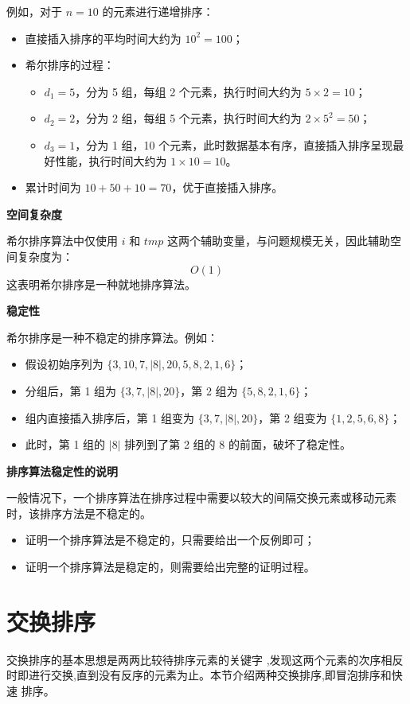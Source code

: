 \documentclass[lang=cn,newtx,10pt,scheme=chinese]{../elegantbook}
\begin{document}
例如，对于 $n = 10$ 的元素进行递增排序：
\begin{itemize}
  \item 直接插入排序的平均时间大约为 $10^2 = 100$；
  \item 希尔排序的过程：
    \begin{itemize}
      \item $d_1 = 5$，分为 5 组，每组 2 个元素，执行时间大约为 $5 \times 2 = 10$；
      \item $d_2 = 2$，分为 2 组，每组 5 个元素，执行时间大约为 $2 \times 5^2 = 50$；
      \item $d_3 = 1$，分为 1 组，10 个元素，此时数据基本有序，直接插入排序呈现最好性能，执行时间大约为 $1 \times 10 = 10$。
    \end{itemize}
  \item 累计时间为 $10 + 50 + 10 = 70$，优于直接插入排序。
\end{itemize}


\textbf{空间复杂度}  

希尔排序算法中仅使用 $i$ 和 $tmp$ 这两个辅助变量，与问题规模无关，因此辅助空间复杂度为：
\[
O(1)
\]
这表明希尔排序是一种就地排序算法。


\textbf{稳定性}  

希尔排序是一种不稳定的排序算法。例如：
\begin{itemize}
  \item 假设初始序列为 $\{3, 10, 7, |8|, 20, 5, 8, 2, 1, 6\}$；
  \item 分组后，第 1 组为 $\{3, 7, |8|, 20\}$，第 2 组为 $\{5, 8, 2, 1, 6\}$；
  \item 组内直接插入排序后，第 1 组变为 $\{3, 7, |8|, 20\}$，第 2 组变为 $\{1, 2, 5, 6, 8\}$；
  \item 此时，第 1 组的 $|8|$ 排列到了第 2 组的 $8$ 的前面，破坏了稳定性。
\end{itemize}


\textbf{排序算法稳定性的说明}

一般情况下，一个排序算法在排序过程中需要以较大的间隔交换元素或移动元素时，该排序方法是不稳定的。  
\begin{itemize}
  \item 证明一个排序算法是不稳定的，只需要给出一个反例即可；
  \item 证明一个排序算法是稳定的，则需要给出完整的证明过程。
\end{itemize}

\section{交换排序}
交换排序的基本思想是两两比较待排序元素的关键字 ,发现这两个元素的次序相反
时即进行交换,直到没有反序的元素为止。本节介绍两种交换排序,即冒泡排序和快速
排序。
\end{document}
